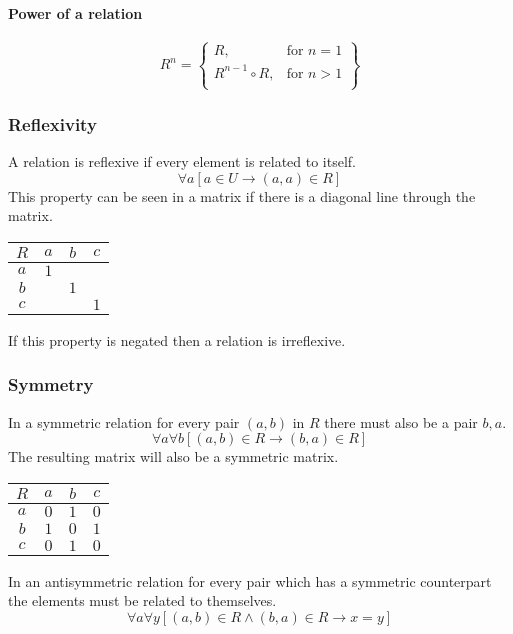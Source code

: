 \documentclass[a4paper, 10pt]{article}
\begin{document}
\paragraph{Power of a relation}
\[ R^n = \left\{
\begin{array}{lr}
    R, & \text{for } n=1 \\
    R^{n-1}\circ R, & \text{for } n>1 \\
\end{array}
\right\}
\]
\subsubsection{Reflexivity}
A relation is reflexive if every element is related to itself.
\[ \forall a[a\in U\rightarrow (a,a)\in R] \]
This property can be seen in a matrix if there is a diagonal line through the matrix.
\begin{center}
    \begin{tabular}{c | c c c}
        \(R\) & \(a\) & \(b\) & \(c\) \\
        \hline
        \(a\) & \(1\) &       &       \\
        \(b\) &       & \(1\) &       \\
        \(c\) &       &       & \(1\) \\
    \end{tabular}
\end{center}
If this property is negated then a relation is irreflexive.
\subsubsection{Symmetry}
In a symmetric relation for every pair \((a,b)\) in \(R\) there must also be a pair \(b,a\).
\[ \forall a\forall b[(a,b)\in R \rightarrow (b,a)\in R] \]
The resulting matrix will also be a symmetric matrix.
\begin{center}
    \begin{tabular}{c | c c c}
        \(R\) & \(a\) & \(b\) & \(c\) \\
        \hline
        \(a\) & \(0\) & \(1\) & \(0\) \\
        \(b\) & \(1\) & \(0\) & \(1\) \\
        \(c\) & \(0\) & \(1\) & \(0\) \\
    \end{tabular}
\end{center}
In an antisymmetric relation for every pair which has a symmetric counterpart the elements must be related to themselves.
\[ \forall a\forall y[(a,b)\in R \land (b,a)\in R \rightarrow x=y] \]
\end{document}
